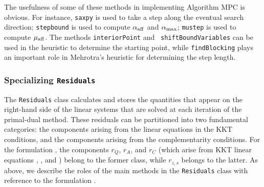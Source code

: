 The usefulness of some of these methods in implementing Algorithm MPC
is obvious. For instance, {\tt saxpy} is used to take a step along the
eventual search direction; {\tt stepbound} is used to compute
$\alpha_{\rm aff}$ and $\alpha_{\rm max}$; {\tt mustep} is used
to compute $\mu_{\rm aff}$. The methods {\tt interiorPoint} and {\tt
  shiftBoundVariables} can be used in the heuristic to determine the
starting point, while {\tt findBlocking} plays an important role in
Mehrotra's heuristic for determining the step length.


\subsubsection{Specializing {\tt Residuals}}
\label{sec:residualsclass}

The {\tt Residuals} class calculates and stores the quantities that
appear on the right-hand side of the linear systems that are solved at
each iteration of the primal-dual method. These residuals can be
partitioned into two fundamental categories: the components arising
from the linear equations in the KKT conditions, and the components
arising from the complementarity conditions. For the formulation
, the components $r_Q$, $r_A$, and $r_C$ (which arise from
KKT linear equations , , and
) belong to the former class, while $r_{z,s}$
belongs to the latter.  As above, we describe the roles of the main
methods in the {\tt Residuals} class with reference to the formulation
.

